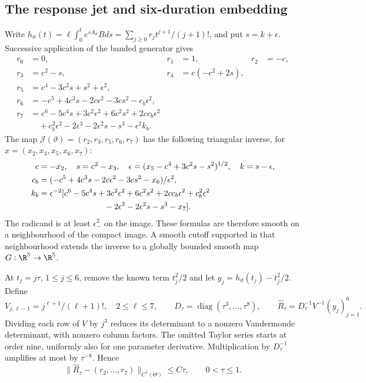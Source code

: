 \subsection{The response jet and six-duration embedding}
Write
\(h_\vartheta(t)=\ell\int_0^te^{sA_\vartheta}Bds
=\sum_{j\ge0}r_jt^{j+1}/(j+1)!\), and put \(s=k+\epsilon\).
Successive application of the banded generator gives
\begin{equation}
\begin{aligned}
 r_0&=0,&r_1&=1,&r_2&=-c,\\
 r_3&=c^2-s,&r_4&=c(-c^2+2s),\\
 r_5&=c^4-3c^2s+s^2+\epsilon^2,\\
 r_6&=-c^5+4c^3s-2c\epsilon^2-3cs^2-c_b\epsilon^2,\\
 r_7&=c^6-5c^4s+3c^2\epsilon^2+6c^2s^2+2cc_b\epsilon^2\\ &\quad
       +c_b^2\epsilon^2-2\epsilon^3-2\epsilon^2s-s^3-\epsilon^2k_b.
\end{aligned}
\label{eq:eight-jets}
\end{equation}
The map \(\mathcal J(\vartheta)=(r_2,r_3,r_5,r_6,r_7)\) has the
following triangular inverse, for \(x=(x_2,x_3,x_5,x_6,x_7)\):
\begin{align}
 c&=-x_2,\quad s=c^2-x_3,\quad
 \epsilon=(x_5-c^4+3c^2s-s^2)^{1/2},\quad k=s-\epsilon,
 \label{eq:jet-inverse-one}\\
 c_b&=(-c^5+4c^3s-2c\epsilon^2-3cs^2-x_6)/\epsilon^2,
 \label{eq:jet-inverse-two}\\
 k_b&=\epsilon^{-2}[c^6-5c^4s+3c^2\epsilon^2+6c^2s^2
 +2cc_b\epsilon^2+c_b^2\epsilon^2\notag\\
 &\hspace{28mm}-2\epsilon^3-2\epsilon^2s-s^3-x_7].
 \label{eq:jet-inverse-three}
\end{align}
The radicand is at least \(\epsilon_-^2\) on the image. These formulas
are therefore smooth on a neighbourhood of the compact image. A smooth
cutoff supported in that neighbourhood extends the inverse to a globally
bounded smooth map \(G:\R^5\to\R^5\).

At \(t_j=j\tau\), \(1\le j\le6\), remove the known term \(t_j^2/2\)
and let \(y_j=h_\vartheta(t_j)-t_j^2/2\). Define
\[
 V_{j,\ell-1}=j^{\ell+1}/(\ell+1)!,\quad 2\le\ell\le7,
 \qquad D_\tau=\operatorname{diag}(\tau^3,\ldots,\tau^8),
 \qquad \widehat R_\tau=D_\tau^{-1}V^{-1}(y_j)_{j=1}^6.
\]
Dividing each row of \(V\) by \(j^3\) reduces its determinant to a
nonzero Vandermonde determinant, with nonzero column factors. The omitted
Taylor series starts at order nine, uniformly also for one parameter
derivative. Multiplication by \(D_\tau^{-1}\) amplifies at most by
\(\tau^{-8}\). Hence
\begin{equation}
 \|\widehat R_\tau-(r_2,\ldots,r_7)\|_{C^1(\Theta)}\le C\tau,
 \qquad 0<\tau\le1.
 \label{eq:recovered-jets}
\end{equation}

